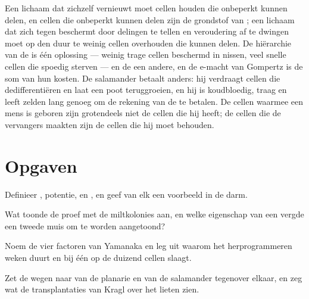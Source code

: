 \begin{remark}\label{rem:b3:stem-cells:remark}
Een lichaam dat zichzelf vernieuwt moet cellen houden die onbeperkt
kunnen delen, en cellen die onbeperkt kunnen delen zijn de grondstof
van ; een lichaam dat zich tegen  beschermt door delingen
te tellen en veroudering af te dwingen moet op den duur te weinig
cellen overhouden die kunnen delen. De hiërarchie van de  is
één oplossing --- weinig trage cellen beschermd in nissen, veel snelle
cellen die spoedig sterven --- en de  een andere, en
de e-macht van Gompertz is de som van hun kosten. De salamander betaalt
anders: hij verdraagt cellen die dedifferentiëren en laat een poot
teruggroeien, en hij is koudbloedig, traag en leeft zelden lang genoeg
om de rekening van de  te betalen. De cellen waarmee een mens is
geboren zijn grotendeels niet de cellen die hij heeft; de cellen die de
vervangers maakten zijn de cellen die hij moet behouden.
\end{remark}

\section{Opgaven}

\begin{exercise}[$\star$]\label{exo:b3:stem-cells:1}
Definieer , potentie,  en ,
en geef van elk een voorbeeld in de darm.
\end{exercise}

\begin{exercise}[$\star$]\label{exo:b3:stem-cells:2}
Wat toonde de proef met de miltkolonies aan, en welke eigenschap van
een  vergde een tweede muis om te worden aangetoond?
\end{exercise}

\begin{exercise}[$\star$]\label{exo:b3:stem-cells:3}
Noem de vier factoren van Yamanaka en leg uit waarom het
herprogrammeren weken duurt en bij één op de duizend cellen slaagt.
\end{exercise}

\begin{exercise}[$\star$]\label{exo:b3:stem-cells:4}
Zet de wegen naar  van de planarie en van de salamander
tegenover elkaar, en zeg wat de transplantaties van Kragl over het
 lieten zien.
\end{exercise}

